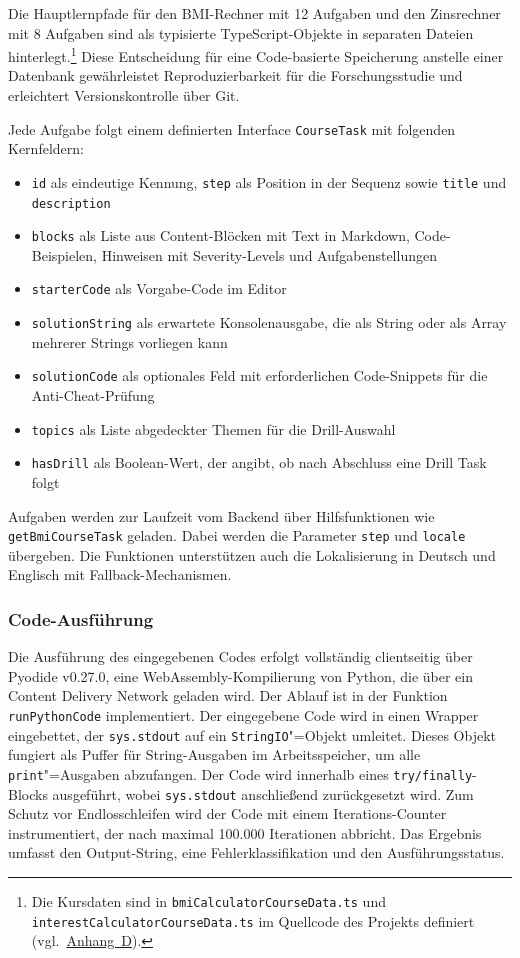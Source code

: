 Die Hauptlernpfade für den BMI-Rechner mit 12 Aufgaben und den Zinsrechner mit 8 Aufgaben sind als typisierte TypeScript-Objekte in separaten Dateien hinterlegt.\footnote{Die Kursdaten sind in \texttt{bmiCalculatorCourseData.ts} und \texttt{interestCalculatorCourseData.ts} im Quellcode des Projekts definiert (vgl.\ \hyperref[appendix:daten]{Anhang~D}).}
Diese Entscheidung für eine Code-basierte Speicherung anstelle einer Datenbank gewährleistet Reproduzierbarkeit für die Forschungsstudie und erleichtert Versionskontrolle über Git.

Jede Aufgabe folgt einem definierten Interface \texttt{CourseTask} mit folgenden Kernfeldern:
\begin{itemize}
    \item \texttt{id} als eindeutige Kennung, \texttt{step} als Position in der Sequenz sowie \texttt{title} und \\ \texttt{description}
    \item \texttt{blocks} als Liste aus Content-Blöcken mit Text in Markdown, Code-Beispielen, Hinweisen mit Severity-Levels und Aufgaben\-stellungen
    \item \texttt{starterCode} als Vorgabe-Code im Editor
    \item \texttt{solutionString} als erwartete Konsolenausgabe, die als String oder als Array mehrerer Strings vorliegen kann
    \item \texttt{solutionCode} als optionales Feld mit erforderlichen Code-Snippets für die Anti-Cheat-Prüfung
    \item \texttt{topics} als Liste abgedeckter Themen für die Drill-Auswahl
    \item \texttt{hasDrill} als Boolean-Wert, der angibt, ob nach Abschluss eine Drill Task folgt
\end{itemize}

Aufgaben werden zur Laufzeit vom Backend über Hilfsfunktionen wie \texttt{getBmiCourseTask} geladen. Dabei werden die Parameter \texttt{step} und \texttt{locale} übergeben. Die Funktionen unterstützen auch die Lokalisierung in Deutsch und Englisch mit Fallback-Mechanismen.

\subsubsection{Code-Ausführung}

Die Ausführung des eingegebenen Codes erfolgt vollständig clientseitig über Pyodide v0.27.0, eine Web\-Assembly-Kompilierung von Python, die über ein Content Delivery Network geladen wird.
Der Ablauf ist in der Funktion \texttt{run\-Python\-Code} implementiert.
Der eingegebene Code wird in einen Wrapper eingebettet, der \texttt{sys.stdout} auf ein \texttt{StringIO}"=Objekt umleitet. Dieses Objekt fungiert als Puffer für String-Ausgaben im Arbeitsspeicher, um alle \texttt{print}"=Ausgaben abzufangen.
Der Code wird innerhalb eines \texttt{try/finally}-Blocks ausgeführt, wobei \texttt{sys.stdout} anschließend zurückgesetzt wird.
Zum Schutz vor Endlosschleifen wird der Code mit einem Iterations-Counter instrumentiert, der nach maximal 100.000 Iterationen abbricht.
Das Ergebnis umfasst den Output-String, eine Fehlerklassifikation und den Ausführungsstatus.


